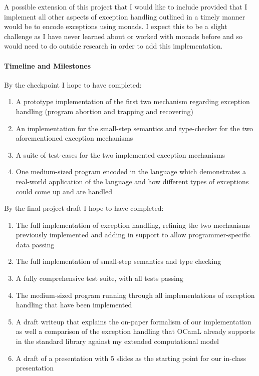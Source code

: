 \documentclass{article}
\begin{document}
A possible extension of this project that I would like to include provided that I implement 
all other aspects of exception handling outlined in a timely manner would be to encode 
exceptions using monads. I expect this to be a slight challenge as I have never learned 
about or worked with monads before and so would need to do outside research in order 
to add this implementation.

\paragraph{Timeline and Milestones}

By the checkpoint I hope to have completed:
\begin{enumerate}
\item A prototype implementation of the first two mechanism regarding exception
handling (program abortion and trapping and recovering)
\item An implementation for the small-step semantics and type-checker for the
two aforementioned exception mechanisms
\item A suite of test-cases for the two implemented exception mechanisms
\item One medium-sized program encoded in the language which demonstrates a
  real-world application of the language and how different types of exceptions could 
  come up and are handled
\end{enumerate}

\noindent
By the final project draft I hope to have completed:
\begin{enumerate}
\item The full implementation of exception handling, refining the two mechanisms 
previously implemented and adding in support to allow programmer-specific data passing
\item The full implementation of small-step semantics and type checking
\item A fully comprehensive test suite, with all tests passing
\item The medium-sized program running through all implementations of exception 
handling that have been implemented
\item A draft writeup that explains the on-paper formalism of our
  implementation as well a comparison of the exception handling that OCamL 
  already supports in the standard library against my extended computational
  model
\item A draft of a presentation with 5 slides as the starting point for our
  in-class presentation
\end{enumerate}
\end{document}

